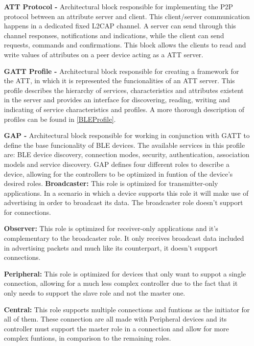 \textbf{\ac{ATT} Protocol -} Architectural block responsible for implementing the \ac{P2P} protocol between an attribute server and client. This client/server communication happens in a dedicated fixed \ac{L2CAP} channel. A server can send through this channel responses, notifications and indications, while the client can send requests, commands and confirmations. This block allows the clients to read and write values of attributes on a peer device acting as a \ac{ATT} server.


\textbf{\ac{GATT} Profile -} Architectural block responsible for creating a framework for the \ac{ATT}, in which it is represented the funcionalities of an \ac{ATT} server. This profile describes the hierarchy of services, characteristics and attributes existent in the server and provides an interface for discovering, reading, writing and indicating of service characteristics and profiles. A more thorough description of profiles can be found in \ref{BLEProfile}.


\textbf{\ac{GAP} -} Architectural block responsible for working in conjunction with \ac{GATT} to define the base funcionality of \ac{BLE} devices. The available services in this profile are: \ac{BLE} device discovery, connection modes, security, authentication, association models and service discovery.
\ac{GAP} defines four different roles to describe a device, allowing for the controllers to be optimized in funtion of the device's desired roles.
\tab \textbf{Broadcaster:} This role is optimized for transmitter-only applications. In a scenario in which a device supports this role it will make use of advertising in order to broadcast its data. The broadcaster role doesn't support for connections.
 
 
\tab \textbf{Observer:} This role is optimized for receiver-only applications and it's complementary to the broadcaster role. It only receives broadcast data included in advertising packets and much like its counterpart, it doesn't support connections.
 

\tab \textbf{Peripheral:} This role is optimized for devices that only want to suppot a single connection, allowing for a much less complex controller due to the fact that it only needs to support the slave role and not the master one.


\tab \textbf{Central:} This role supports multiple connections and funtions as the initiator for all of them. These connection are all made with Peripheral devices and its controller must support the master role in a connection and allow for more complex funtions, in comparison to the remaining roles.


